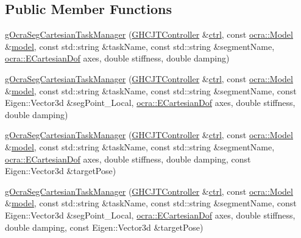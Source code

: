\subsection*{Public Member Functions}
\begin{DoxyCompactItemize}
\item 
\hyperlink{classgocra_1_1gOcraSegCartesianTaskManager_adea9d716dfc3751b4ce088e8f5617fcd}{g\+Ocra\+Seg\+Cartesian\+Task\+Manager} (\hyperlink{classgocra_1_1GHCJTController}{G\+H\+C\+J\+T\+Controller} \&\hyperlink{classgocra_1_1gOcraTaskManagerBase_a52d76d9b54d92f3d31faeaafda99e4c7}{ctrl}, const \hyperlink{classocra_1_1Model}{ocra\+::\+Model} \&\hyperlink{classgocra_1_1gOcraTaskManagerBase_adc439e7170f7120611fc6d009d06404e}{model}, const std\+::string \&task\+Name, const std\+::string \&segment\+Name, \hyperlink{namespaceocra_a436781c7059a0f76027df1c652126260}{ocra\+::\+E\+Cartesian\+Dof} axes, double stiffness, double damping)
\item 
\hyperlink{classgocra_1_1gOcraSegCartesianTaskManager_a33e6727a735de2c8564442f0cb5a3976}{g\+Ocra\+Seg\+Cartesian\+Task\+Manager} (\hyperlink{classgocra_1_1GHCJTController}{G\+H\+C\+J\+T\+Controller} \&\hyperlink{classgocra_1_1gOcraTaskManagerBase_a52d76d9b54d92f3d31faeaafda99e4c7}{ctrl}, const \hyperlink{classocra_1_1Model}{ocra\+::\+Model} \&\hyperlink{classgocra_1_1gOcraTaskManagerBase_adc439e7170f7120611fc6d009d06404e}{model}, const std\+::string \&task\+Name, const std\+::string \&segment\+Name, const Eigen\+::\+Vector3d \&seg\+Point\+\_\+\+Local, \hyperlink{namespaceocra_a436781c7059a0f76027df1c652126260}{ocra\+::\+E\+Cartesian\+Dof} axes, double stiffness, double damping)
\item 
\hyperlink{classgocra_1_1gOcraSegCartesianTaskManager_ad67e87ee2d9ee4337bbe322f3bc34e19}{g\+Ocra\+Seg\+Cartesian\+Task\+Manager} (\hyperlink{classgocra_1_1GHCJTController}{G\+H\+C\+J\+T\+Controller} \&\hyperlink{classgocra_1_1gOcraTaskManagerBase_a52d76d9b54d92f3d31faeaafda99e4c7}{ctrl}, const \hyperlink{classocra_1_1Model}{ocra\+::\+Model} \&\hyperlink{classgocra_1_1gOcraTaskManagerBase_adc439e7170f7120611fc6d009d06404e}{model}, const std\+::string \&task\+Name, const std\+::string \&segment\+Name, \hyperlink{namespaceocra_a436781c7059a0f76027df1c652126260}{ocra\+::\+E\+Cartesian\+Dof} axes, double stiffness, double damping, const Eigen\+::\+Vector3d \&target\+Pose)
\item 
\hyperlink{classgocra_1_1gOcraSegCartesianTaskManager_a14780eadde3c5c3c9d3d92b011e0003b}{g\+Ocra\+Seg\+Cartesian\+Task\+Manager} (\hyperlink{classgocra_1_1GHCJTController}{G\+H\+C\+J\+T\+Controller} \&\hyperlink{classgocra_1_1gOcraTaskManagerBase_a52d76d9b54d92f3d31faeaafda99e4c7}{ctrl}, const \hyperlink{classocra_1_1Model}{ocra\+::\+Model} \&\hyperlink{classgocra_1_1gOcraTaskManagerBase_adc439e7170f7120611fc6d009d06404e}{model}, const std\+::string \&task\+Name, const std\+::string \&segment\+Name, const Eigen\+::\+Vector3d \&seg\+Point\+\_\+\+Local, \hyperlink{namespaceocra_a436781c7059a0f76027df1c652126260}{ocra\+::\+E\+Cartesian\+Dof} axes, double stiffness, double damping, const Eigen\+::\+Vector3d \&target\+Pose)

\end{DoxyCompactItemize}
